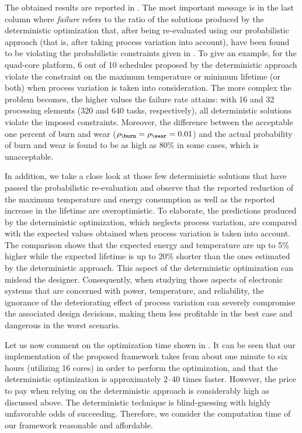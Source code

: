 The obtained results are reported in . The
most important message is in the last column where \emph{failure} refers to the
ratio of the solutions produced by the deterministic optimization that, after
being re-evaluated using our probabilistic approach (that is, after taking
process variation into account), have been found to be violating the
probabilistic constraints given in . To
give an example, for the quad-core platform, 6 out of 10 schedules proposed by
the deterministic approach violate the constraint on the maximum temperature or
minimum lifetime (or both) when process variation is taken into consideration.
The more complex the problem becomes, the higher values the failure rate
attains: with 16 and 32 processing elements (320 and 640 tasks, respectively),
all deterministic solutions violate the imposed constraints. Moreover, the
difference between the acceptable one percent of burn and wear ($\rho_\burn =
\rho_\wear = 0.01$) and the actual probability of burn and wear is found to be
as high as 80\% in some cases, which is unacceptable.

In addition, we take a close look at those few deterministic solutions that have
passed the probabilistic re-evaluation and observe that the reported reduction
of the maximum temperature and energy consumption as well as the reported
increase in the lifetime are overoptimistic. To elaborate, the predictions
produced by the deterministic optimization, which neglects process variation,
are compared with the expected values obtained when process variation is taken
into account. The comparison shows that the expected energy and temperature are
up to 5\% higher while the expected lifetime is up to 20\% shorter than the ones
estimated by the deterministic approach. This aspect of the deterministic
optimization can mislead the designer. Consequently, when studying those aspects
of electronic systems that are concerned with power, temperature, and
reliability, the ignorance of the deteriorating effect of process variation can
severely compromise the associated design decisions, making them less profitable
in the best case and dangerous in the worst scenario.

Let us now comment on the optimization time shown in
. It can be seen that our implementation of
the proposed framework takes from about one minute to six hours (utilizing 16
cores) in order to perform the optimization, and that the deterministic
optimization is approximately 2--40 times faster. However, the price to pay when
relying on the deterministic approach is considerably high as discussed above.
The deterministic technique is blind-guessing with highly unfavorable odds of
succeeding. Therefore, we consider the computation time of our framework
reasonable and affordable.

